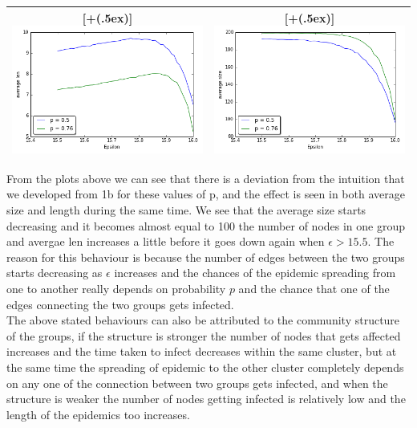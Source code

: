 \documentclass{article}
\newcommand*{\addheight}[2][.5ex]{%
  \raisebox{0pt}[\dimexpr\height+(#1)\relax]{#2}%
}
\begin{document}
\begin{enumerate}[label=(\alph*)]
\begin{table}[H]
\centering
\begin{tabular}{|c|c|}
	\hline
	\addheight{\includegraphics[width=80mm]{images/1c_len.png}} &
	\addheight{\includegraphics[width=80mm]{images/1c_size.png}} \\
	\hline
\end{tabular}
\end{table}
From the plots above we can see that there is a deviation from the intuition that we developed from 1b for these values of p, and the effect is seen in both average size and length during the same time. We see that the average size starts decreasing and it becomes almost equal to 100 the number of nodes in one group and avergae len increases a little before it goes down again when $\epsilon > 15.5$. The reason for this behaviour is because the number of edges between the two groups starts decreasing as $\epsilon$ increases and the chances of the epidemic spreading from one to another really depends on probability $p$ and the chance that one of the edges connecting the two groups gets infected.\\

The above stated behaviours can also be attributed to the community structure of the groups, if the structure is stronger the number of nodes that gets affected increases and the time taken to infect decreases within the same cluster, but at the same time the spreading of epidemic to the other cluster completely depends on any one of the connection between two groups gets infected, and when the structure is weaker the number of nodes getting infected is relatively low and the length of the epidemics too increases.\\ 


\end{enumerate}
\end{document}
